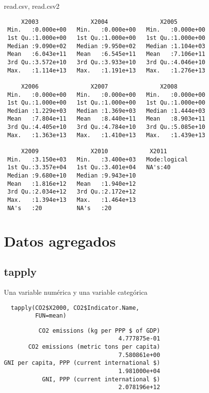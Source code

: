 \documentclass[xcolor={usenames,svgnames,dvipsnames}]{beamer}
\begin{document}
\begin{frame}[fragile,label=sec-1-2-3]{read.csv, read.csv2}
\begin{verbatim}
     X2003               X2004               X2005          
 Min.   :0.000e+00   Min.   :0.000e+00   Min.   :0.000e+00  
 1st Qu.:1.000e+00   1st Qu.:1.000e+00   1st Qu.:1.000e+00  
 Median :9.090e+02   Median :9.950e+02   Median :1.104e+03  
 Mean   :6.043e+11   Mean   :6.545e+11   Mean   :7.106e+11  
 3rd Qu.:3.572e+10   3rd Qu.:3.933e+10   3rd Qu.:4.046e+10  
 Max.   :1.114e+13   Max.   :1.191e+13   Max.   :1.276e+13  
                                                            
     X2006               X2007               X2008          
 Min.   :0.000e+00   Min.   :0.000e+00   Min.   :0.000e+00  
 1st Qu.:1.000e+00   1st Qu.:1.000e+00   1st Qu.:1.000e+00  
 Median :1.229e+03   Median :1.369e+03   Median :1.444e+03  
 Mean   :7.804e+11   Mean   :8.440e+11   Mean   :8.903e+11  
 3rd Qu.:4.405e+10   3rd Qu.:4.784e+10   3rd Qu.:5.085e+10  
 Max.   :1.363e+13   Max.   :1.410e+13   Max.   :1.439e+13  
                                                            
     X2009               X2010            X2011        
 Min.   :3.150e+03   Min.   :3.400e+03   Mode:logical  
 1st Qu.:3.357e+04   1st Qu.:3.401e+04   NA's:40       
 Median :9.680e+10   Median :9.943e+10                 
 Mean   :1.816e+12   Mean   :1.940e+12                 
 3rd Qu.:2.034e+12   3rd Qu.:2.172e+12                 
 Max.   :1.394e+13   Max.   :1.464e+13                 
 NA's   :20          NA's   :20
\end{verbatim}
\end{frame}

\section{Datos agregados}
\label{sec-2}
\subsection{tapply}
\label{sec-2-1}
\begin{frame}[fragile,label=sec-2-1-1]{Una variable numérica y una variable categórica}
 \lstset{language=R,label= ,caption= ,numbers=none}
\begin{lstlisting}
  tapply(CO2$X2000, CO2$Indicator.Name,
         FUN=mean)
\end{lstlisting}

\begin{verbatim}
          CO2 emissions (kg per PPP $ of GDP) 
                                 4.777875e-01 
       CO2 emissions (metric tons per capita) 
                                 7.580861e+00 
GNI per capita, PPP (current international $) 
                                 1.981000e+04 
           GNI, PPP (current international $) 
                                 2.078196e+12
\end{verbatim}
\end{frame}
\end{document}
